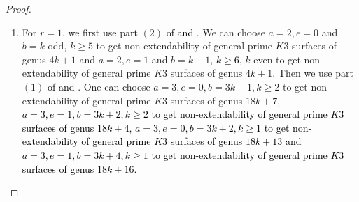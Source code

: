\documentclass[11pt,twoside]{amsart}
\theoremstyle{plain}
\numberwithin{equation}{section}
\theoremstyle{definition}
\begin{document}
\begin{proof}
\begin{enumerate}
        \item[(5)] For $r = 1$, we first use part $(2)$ \textcolor{black}{of  and }. We can choose $a = 2, e = 0$  and $b = k$ odd, $k \geq 5$ to get non-extendability of general prime $K3$ surfaces of genus $4k+1$ and $a = 2, e = 1$  and $b = k+1$, \textcolor{black}{$k \geq 6$}, $k$ even to get non-extendability of general prime $K3$ surfaces of genus $4k+1$. Then we use part $(1)$ \textcolor{black}{of  and }. One can choose $a = 3, e = 0, b = 3k+1, k \geq 2$ to get non-extendability of general prime $K3$ surfaces of genus $18k+7$, \textcolor{black}{$a = 3, e = 1, b = 3k+2, k \geq 2$ to get non-extendability of general prime $K3$ surfaces of genus $18k+4$, $a = 3, e = 0, b = 3k+2, k \geq 1$ to get non-extendability of general prime $K3$ surfaces of genus $18k+13$ and $a = 3, e = 1, b = 3k+4, k \geq 1$ to get non-extendability of general prime $K3$ surfaces of genus $18k+16$. } 
       
       
       
        

        
     
    \end{enumerate}
\end{proof}
\end{document}
